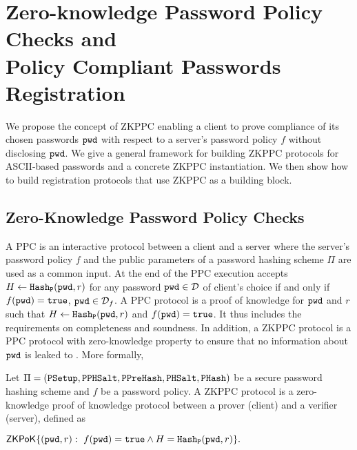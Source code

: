 \section{Zero-knowledge Password Policy Checks and\\ Policy Compliant Passwords Registration} \label{sec:zkppc}

We propose the concept of \ac{ZKPPC} enabling a client to prove compliance of its chosen passwords $\mathtt{pwd}$ with respect to a server's password policy $f$ without disclosing $\mathtt{pwd}$. 
We give a general framework for building \ac{ZKPPC} protocols for \ac{ASCII}-based passwords and a concrete \ac{ZKPPC} instantiation. 
We then show how to build registration protocols that use \ac{ZKPPC} as a building block.

\subsection{Zero-Knowledge Password Policy Checks}
A \ac{PPC} is an interactive protocol between a client \Client and a server \Server where the server's password policy $f$ and the public parameters of a password hashing scheme $\Pi$ are used as a common input. 
At the end of the \ac{PPC} execution \Server accepts $H\gets \mathtt{Hash_P}(\mathtt{pwd},r)$ for any password $\mathtt{pwd}\in\mathcal{D}$ of client's choice if and only if $f(\mathtt{pwd})=\mathtt{true}$, \ie $\mathtt{pwd}\in\mathcal{D}_f$. 
A \ac{PPC} protocol is a proof of knowledge for $\mathtt{pwd}$ and $r$ such that $H\gets \mathtt{Hash_P}(\mathtt{pwd},r)$ and $f(\mathtt{pwd})=\mathtt{true}$. 
It thus includes the requirements on completeness and soundness. 
In addition, a \ac{ZKPPC} protocol is a \ac{PPC} protocol with zero-knowledge property to ensure that no information about $\mathtt{pwd}$ is leaked to \Server. 
More formally, %


\begin{definition}[ZKPPC]\label{def:pocopas}
Let $\Pi=(\mathtt{PSetup},\allowbreak\mathtt{PPHSalt},\allowbreak\mathtt{PPreHash},\mathtt{PHSalt},\allowbreak\mathtt{PHash})$ be a secure password hashing scheme and $f$ be a password policy. A \ac{ZKPPC} protocol is a zero-knowledge proof of knowledge protocol between a prover \Client (client) and a verifier \Server (server), defined as
\begin{center}$\mathsf{ZKPoK}\{(\mathtt{pwd},r):~f(\mathtt{pwd})=\mathtt{true} \wedge H=\mathtt{Hash_P}(\mathtt{pwd},r)\}.$\end{center}
\eod
\end{definition}

